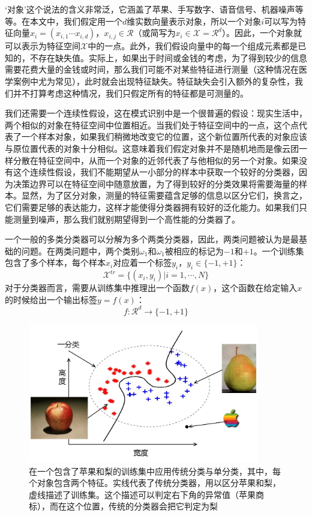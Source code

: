 \documentclass{ctexrep}
\begin{document}
‘对象’这个说法的含义非常泛，它涵盖了苹果、手写数字、语音信号、机器噪声等等。在本文中，我们假定用一个$d$维实数向量表示对象，所以一个对象$i$可以写为特征向量$x_i=(x_{i,1} \cdots x_{i, d})$，$x_{i, j} \in \mathcal{R}$（或简写为$x_i \in \mathcal{X}=\mathcal{R}^d$）。因此，一个对象就可以表示为特征空间$\mathcal{X}$中的一点。此外，我们假设向量中的每一个组成元素都是已知的，不存在缺失值。实际上，如果出于时间或金钱的考虑，为了得到较少的信息需要花费大量的金钱或时间，那么我们可能不对某些特征进行测量（这种情况在医学案例中尤为常见），此时就会出现特征缺失。特征缺失会引入额外的复杂性，我们并不打算考虑这种情况，我们只假定所有的特征都是可测量的。

我们还需要一个连续性假设，这在模式识别中是一个很普遍的假设：现实生活中，两个相似的对象在特征空间中位置相近。当我们处于特征空间中的一点，这个点代表了一个样本对象，如果我们稍微地改变它的位置，这个新位置所代表的对象应该与原位置代表的对象十分相似。这意味着我们假定对象并不是随机地而是像云团一样分散在特征空间中，从而一个对象的近邻代表了与他相似的另一个对象。如果没有这个连续性假设，我们不能期望从一小部分的样本中获取一个较好的分类器，因为决策边界可以在特征空间中随意放置，为了得到较好的分类效果将需要海量的样本。显然，为了区分对象，测量的特征需要蕴含足够的信息以区分它们，换言之，它们需要足够的表达能力，这样才能使得分类器拥有较好的泛化能力。如果我们只能测量到噪声，那么我们就别期望得到一个高性能的分类器了。

一个一般的多类分类器可以分解为多个两类分类器，因此，两类问题被认为是最基础的问题。在两类问题中，两个类别$\omega_1$和$\omega_1$被相应的标记为$-1$和$+1$。一个训练集包含了多个样本，每个样本$x_i$对应着一个标签$y_i$，$y_i \in \{-1, +1\}$：
\begin{equation}
\mathcal{X}^{tr} = \Big\{(x_i, y_i)|i=1, \cdots, N\Big\}
\end{equation}
对于分类器而言，需要从训练集中推理出一个函数$f(x)$，这个函数在给定输入$x$的时候给出一个输出标签$y = f(x)$：
\begin{equation}
f:\mathcal{R}^d \rightarrow \{-1, +1\}
\end{equation}

\begin{figure}[htbp]
  \centering
  \includegraphics[width=0.9\textwidth]{figure/fig1.jpg}
  \caption{在一个包含了苹果和梨的训练集中应用传统分类与单分类，其中，每个对象包含两个特征。实线代表了传统分类器，用以区分苹果和梨，虚线描述了训练集。这个描述可以判定右下角的异常值（苹果商标），而在这个位置，传统的分类器会把它判定为梨}
  \label{fig:fig1}
\end{figure}
\end{document}
